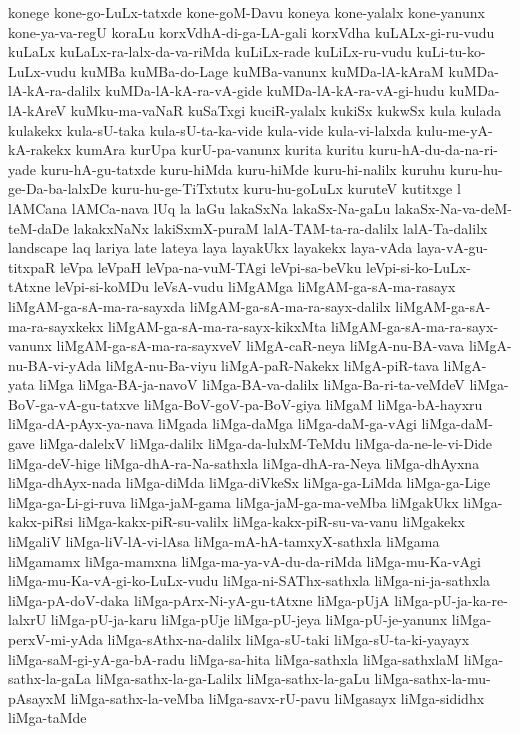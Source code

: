 {konege
kone-go-LuLx-tatxde
kone-goM-Davu
koneya
kone-yalalx
kone-yanunx
kone-ya-va-regU
koraLu
korxVdhA-di-ga-LA-gali
korxVdha
kuLALx-gi-ru-vudu
kuLaLx
kuLaLx-ra-lalx-da-va-riMda
kuLiLx-rade
kuLiLx-ru-vudu
kuLi-tu-ko-LuLx-vudu
kuMBa
kuMBa-do-Lage
kuMBa-vanunx
kuMDa-lA-kAraM
kuMDa-lA-kA-ra-dalilx
kuMDa-lA-kA-ra-vA-gide
kuMDa-lA-kA-ra-vA-gi-hudu
kuMDa-lA-kAreV
kuMku-ma-vaNaR
kuSaTxgi
kuciR-yalalx
kukiSx
kukwSx
kula
kulada
kulakekx
kula-sU-taka
kula-sU-ta-ka-vide
kula-vide
kula-vi-lalxda
kulu-me-yA-kA-rakekx
kumAra
kurUpa
kurU-pa-vanunx
kurita
kuritu
kuru-hA-du-da-na-ri-yade
kuru-hA-gu-tatxde
kuru-hiMda
kuru-hiMde
kuru-hi-nalilx
kuruhu
kuru-hu-ge-Da-ba-lalxDe
kuru-hu-ge-TiTxtutx
kuru-hu-goLuLx
kuruteV
kutitxge
l
lAMCana
lAMCa-nava
lUq
la
laGu
lakaSxNa
lakaSx-Na-gaLu
lakaSx-Na-va-deM-teM-daDe
lakakxNaNx
lakiSxmX-puraM
lalA-TAM-ta-ra-dalilx
lalA-Ta-dalilx
landscape
laq
lariya
late
lateya
laya
layakUkx
layakekx
laya-vAda
laya-vA-gu-titxpaR
leVpa
leVpaH
leVpa-na-vuM-TAgi
leVpi-sa-beVku
leVpi-si-ko-LuLx-tAtxne
leVpi-si-koMDu
leVsA-vudu
liMgAMga
liMgAM-ga-sA-ma-rasayx
liMgAM-ga-sA-ma-ra-sayxda
liMgAM-ga-sA-ma-ra-sayx-dalilx
liMgAM-ga-sA-ma-ra-sayxkekx
liMgAM-ga-sA-ma-ra-sayx-kikxMta
liMgAM-ga-sA-ma-ra-sayx-vanunx
liMgAM-ga-sA-ma-ra-sayxveV
liMgA-caR-neya
liMgA-nu-BA-vava
liMgA-nu-BA-vi-yAda
liMgA-nu-Ba-viyu
liMgA-paR-Nakekx
liMgA-piR-tava
liMgA-yata
liMga
liMga-BA-ja-navoV
liMga-BA-va-dalilx
liMga-Ba-ri-ta-veMdeV
liMga-BoV-ga-vA-gu-tatxve
liMga-BoV-goV-pa-BoV-giya
liMgaM
liMga-bA-hayxru
liMga-dA-pAyx-ya-nava
liMgada
liMga-daMga
liMga-daM-ga-vAgi
liMga-daM-gave
liMga-dalelxV
liMga-dalilx
liMga-da-lulxM-TeMdu
liMga-da-ne-le-vi-Dide
liMga-deV-hige
liMga-dhA-ra-Na-sathxla
liMga-dhA-ra-Neya
liMga-dhAyxna
liMga-dhAyx-nada
liMga-diMda
liMga-diVkeSx
liMga-ga-LiMda
liMga-ga-Lige
liMga-ga-Li-gi-ruva
liMga-jaM-gama
liMga-jaM-ga-ma-veMba
liMgakUkx
liMga-kakx-piRsi
liMga-kakx-piR-su-valilx
liMga-kakx-piR-su-va-vanu
liMgakekx
liMgaliV
liMga-liV-lA-vi-lAsa
liMga-mA-hA-tamxyX-sathxla
liMgama
liMgamamx
liMga-mamxna
liMga-ma-ya-vA-du-da-riMda
liMga-mu-Ka-vAgi
liMga-mu-Ka-vA-gi-ko-LuLx-vudu
liMga-ni-SAThx-sathxla
liMga-ni-ja-sathxla
liMga-pA-doV-daka
liMga-pArx-Ni-yA-gu-tAtxne
liMga-pUjA
liMga-pU-ja-ka-re-lalxrU
liMga-pU-ja-karu
liMga-pUje
liMga-pU-jeya
liMga-pU-je-yanunx
liMga-perxV-mi-yAda
liMga-sAthx-na-dalilx
liMga-sU-taki
liMga-sU-ta-ki-yayayx
liMga-saM-gi-yA-ga-bA-radu
liMga-sa-hita
liMga-sathxla
liMga-sathxlaM
liMga-sathx-la-gaLa
liMga-sathx-la-ga-Lalilx
liMga-sathx-la-gaLu
liMga-sathx-la-mu-pAsayxM
liMga-sathx-la-veMba
liMga-savx-rU-pavu
liMgasayx
liMga-sididhx
liMga-taMde
}
